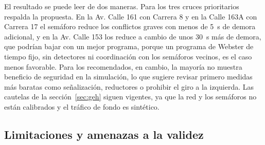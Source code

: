 El resultado se puede leer de dos maneras. Para los tres cruces prioritarios respalda la propuesta. En la Av. Calle 161 con Carrera 8 y en la Calle 163A con Carrera 17 el semáforo reduce los conflictos graves con menos de 5~s de demora adicional, y en la Av. Calle 153 los reduce a cambio de unos 30~s más de demora, que podrían bajar con un mejor programa, porque un programa de Webster de tiempo fijo, sin detectores ni coordinación con los semáforos vecinos, es el caso menos favorable. Para los recomendados, en cambio, la mayoría no muestra beneficio de seguridad en la simulación, lo que sugiere revisar primero medidas más baratas como señalización, reductores o prohibir el giro a la izquierda. Las cautelas de la sección~\ref{sec:geh} siguen vigentes, ya que la red y los semáforos no están calibrados y el tráfico de fondo es sintético.

\subsection{Limitaciones y amenazas a la validez}
\label{sec:limitaciones-resultados}

